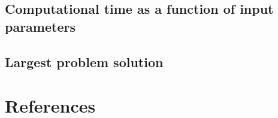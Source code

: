 \documentclass[preprint,12pt]{elsarticle}
\begin{document}
\subsection{Computational time as a function of input parameters}
\subsection{Largest problem solution}









	\newpage
	
\section{References}
	
	
	
						
	
	
	
	
	
\end{document}
